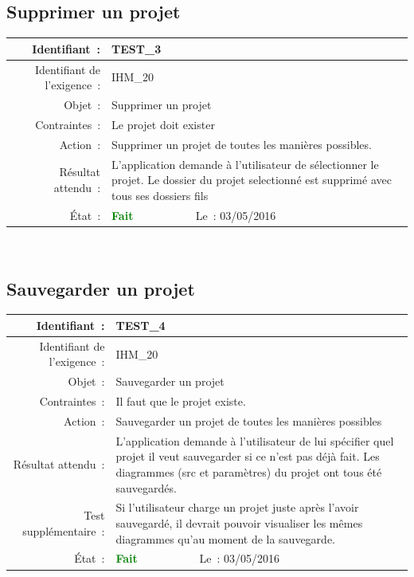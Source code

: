 \documentclass[hidelinks, a4paper,11pt,twoside,final]{article}
\begin{document}
     \subsection*{Supprimer un projet}
    \begin{tabular}{|r|p{5cm}|p{5cm}|}\hline
    {Identifiant~:} & \multicolumn{2}{|p{10cm}|}{TEST\_3} \\\hline
    {Identifiant de l’exigence~:} & \multicolumn{2}{|p{10cm}|}{IHM\_20} \\\hline
        {Objet~:} & \multicolumn{2}{|p{10cm}|}{Supprimer un projet} \\\hline
        {Contraintes~:} & \multicolumn{2}{|p{10cm}|}{Le projet doit exister} \\\hline
        {Action~:} & \multicolumn{2}{|p{10cm}|}{Supprimer un projet de toutes les manières possibles.} \\\hline
        {Résultat attendu~:} & \multicolumn{2}{|p{10cm}|}{L’application demande à l’utilisateur de sélectionner le projet.
                              Le dossier du projet selectionné est supprimé avec tous ses dossiers fils} \\\hline
        {État~:} & {\textcolor{green}{\textbf{Fait}}} & {Le~: 03/05/2016 } \\\hline
    \end{tabular}
    \\
    \newline

    \subsection*{Sauvegarder un projet}
    \begin{tabular}{|r|p{5cm}|p{5cm}|}\hline
    {Identifiant~:} & \multicolumn{2}{|p{10cm}|}{TEST\_4} \\\hline
    {Identifiant de l’exigence~:} & \multicolumn{2}{|p{10cm}|}{IHM\_20} \\\hline
        {Objet~:} & \multicolumn{2}{|p{10cm}|}{Sauvegarder un projet} \\\hline
        {Contraintes~:} & \multicolumn{2}{|p{10cm}|}{Il faut que le projet existe.} \\\hline
        {Action~:} & \multicolumn{2}{|p{10cm}|}{Sauvegarder un projet de toutes les manières possibles} \\\hline
        {Résultat attendu~:} & \multicolumn{2}{|p{10cm}|}{L’application demande à l’utilisateur de lui spécifier quel projet il veut sauvegarder si ce n’est pas déjà fait.
                            Les diagrammes (src et paramètres) du projet ont tous été sauvegardés.} \\\hline
    {Test supplémentaire~:} & \multicolumn{2}{|p{10cm}|}{Si l’utilisateur charge un projet juste après l’avoir sauvegardé, il devrait
                                pouvoir visualiser les mêmes diagrammes qu’au moment de la sauvegarde.} \\\hline
        {État~:} & {\textcolor{green}{\textbf{Fait}}} & {Le~: 03/05/2016 } \\\hline
    \end{tabular}
    \\
    \newline
\end{document}
